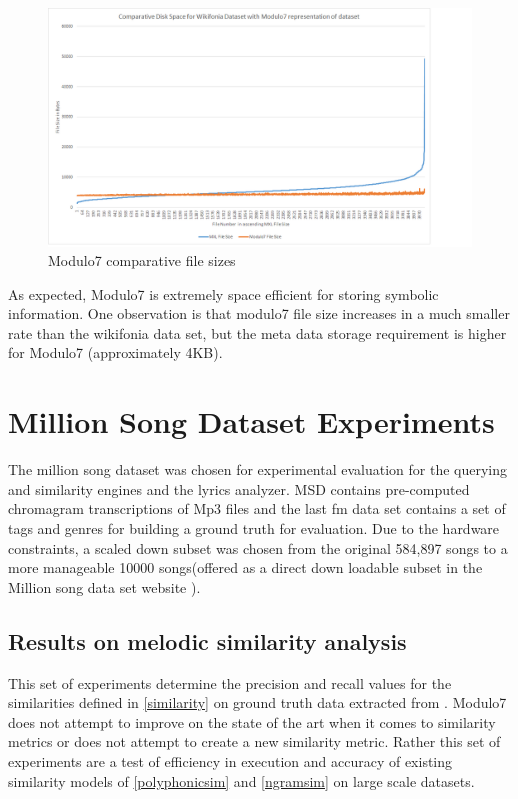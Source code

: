\begin{figure}[!htb]
\centering
\includegraphics[width=\textwidth]{M7Graph.png}
\makeatletter
\let\@currsize\normalsize
\caption{Modulo7 comparative file sizes}
\label{fig:filesizes}
\end{figure}

\noindent As expected, Modulo7 is extremely space efficient for storing symbolic information. One observation is that modulo7 file size increases in a much smaller rate than the wikifonia data set, but the meta data storage requirement is higher for Modulo7 (approximately 4KB). 
\section{Million Song Dataset Experiments}

\noindent The million song dataset was chosen for experimental evaluation \cite{msd} for the querying and similarity engines and the lyrics analyzer. MSD contains pre-computed chromagram transcriptions of Mp3 files and the last fm data set contains a set of tags and genres for building a  ground truth for evaluation. Due to the hardware constraints, a scaled down subset was chosen from the original 584,897 songs to a more manageable 10000 songs(offered as a direct down loadable subset in the Million song data set website \cite{msddownloadable}).

\subsection{Results on melodic similarity analysis}

\noindent This set of experiments determine the precision and recall values for the similarities defined in \ref{similarity} on ground truth data extracted from \cite{msd}. Modulo7 does not attempt to improve on the state of the art when it comes to similarity metrics or does not attempt to create a new similarity metric. Rather this set of experiments are a test of efficiency in execution and accuracy of existing similarity models of \ref{polyphonicsim} and \ref{ngramsim} on large scale datasets. \\

